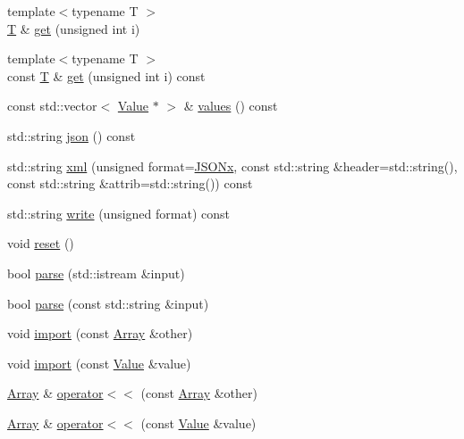 \begin{DoxyCompactItemize}
\item 
{\footnotesize template$<$typename T $>$ }\\\hyperlink{http__parser_8c_ad24d0de3f597ca60dd95c4bc59c2ff73}{T} \& \hyperlink{classjsonxx_1_1_array_a6d2ec7aea161517f40a9b22069c4f0f3}{get} (unsigned int i)
\item 
{\footnotesize template$<$typename T $>$ }\\const \hyperlink{http__parser_8c_ad24d0de3f597ca60dd95c4bc59c2ff73}{T} \& \hyperlink{classjsonxx_1_1_array_ae2eded20698492b4cd4449c1f68487c6}{get} (unsigned int i) const 
\item 
const std\+::vector$<$ \hyperlink{classjsonxx_1_1_value}{Value} $\ast$ $>$ \& \hyperlink{classjsonxx_1_1_array_a98b406fd55e177daa00600f5f0040718}{values} () const 
\item 
std\+::string \hyperlink{classjsonxx_1_1_array_a3245276b73108f6b15eb0a14ba5c847a}{json} () const 
\item 
std\+::string \hyperlink{classjsonxx_1_1_array_aeac2026e7569cf4bd465daec6162d719}{xml} (unsigned format=\hyperlink{namespacejsonxx_a1dc6d8d59422ab47976163f874939455af38f9355cff13d4780a62c136d156160}{J\+S\+O\+Nx}, const std\+::string \&header=std\+::string(), const std\+::string \&attrib=std\+::string()) const 
\item 
std\+::string \hyperlink{classjsonxx_1_1_array_a93ef3fe0d272693649d0a4b446fa3158}{write} (unsigned format) const 
\item 
void \hyperlink{classjsonxx_1_1_array_a283d4558fa4c97159c96b721f71bef17}{reset} ()
\item 
bool \hyperlink{classjsonxx_1_1_array_af83237b60bde755985ace8af51996040}{parse} (std\+::istream \&input)
\item 
bool \hyperlink{classjsonxx_1_1_array_a7616aa963d2500cad73027fd7be2a76a}{parse} (const std\+::string \&input)
\item 
void \hyperlink{classjsonxx_1_1_array_a5babf25e4cccfb5a1283530152d8954e}{import} (const \hyperlink{classjsonxx_1_1_array}{Array} \&other)
\item 
void \hyperlink{classjsonxx_1_1_array_a55457d3987ff7be2e0db3b7081bc7201}{import} (const \hyperlink{classjsonxx_1_1_value}{Value} \&value)
\item 
\hyperlink{classjsonxx_1_1_array}{Array} \& \hyperlink{classjsonxx_1_1_array_ab36ad1fe4d2a6be62f30d028394dcaf3}{operator$<$$<$} (const \hyperlink{classjsonxx_1_1_array}{Array} \&other)
\item 
\hyperlink{classjsonxx_1_1_array}{Array} \& \hyperlink{classjsonxx_1_1_array_adf115db7a2fbe0602d34ba68e25e1ac6}{operator$<$$<$} (const \hyperlink{classjsonxx_1_1_value}{Value} \&value)

\end{DoxyCompactItemize}
